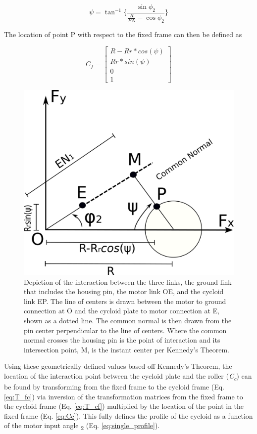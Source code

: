 \begin{equation} \label{eq:psi}
\psi = \tan^{-1}{\bigg\{\frac{\sin\phi_2}{\frac{R}{EN} - \cos{\phi_2}}\bigg\}}
\end{equation}

The location of point P with respect to the fixed frame can then be defined as 

\begin{equation} \label{eq:Cf}
C_f = \left[\begin{array}{c}
		R-Rr*cos(\psi)\\
		Rr*sin(\psi)\\
		0\\
		1
		\end{array} \right]
\end{equation}


\begin{figure}[t]
   \centering
   \includegraphics[width=0.60\linewidth]{fig/single_stage_angles}
   \caption{Depiction of the interaction between the three links, the ground link that includes the housing pin, the motor link OE, and the cycloid link EP. The line of centers is drawn between the motor to ground connection at O and the cycloid plate to motor connection at E, shown as a dotted line. The common normal is then drawn from the pin center perpendicular to the line of centers. Where the common normal crosses the housing pin is the point of interaction and its intersection point, M, is the instant center per Kennedy's Theorem.}
   \label{fig:single_angles}
\end{figure}

Using these geometrically defined values based off Kennedy's Theorem, the location of the interaction point between the cycloid plate and the roller (\textit{C\textsubscript{c}}) can be found by transforming from the fixed frame to the cycloid frame (Eq. \ref{eq:T_fc}) via inversion of the transformation matrices from the fixed frame to the cycloid frame (Eq. \ref{eq:T_cf}) multiplied by the location of the point in the fixed frame (Eq. \ref{eq:Cc}). This fully defines the profile of the cycloid as a function of the motor input angle \textphi\textsubscript{2} (Eq. \ref{eq:single_profile}).

